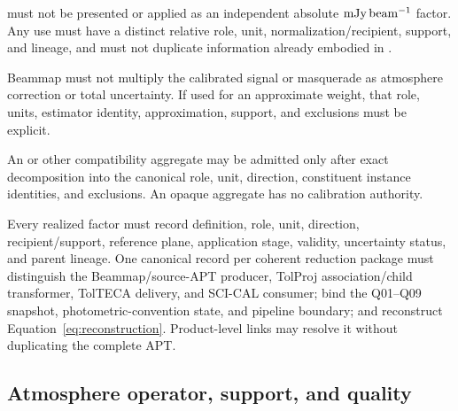 \begin{description}[style=nextline]
\item[\Req{017}: responsivity boundary.]
   must not be presented or applied as an independent
  absolute \(\mathrm{mJy\,beam^{-1}}\) factor. Any use must have a distinct relative role,
  unit, normalization/recipient, support, and lineage, and must not duplicate
  information already embodied in .

\item[\Req{018}: sensitivity boundary.]
  Beammap  must not multiply the calibrated signal or masquerade as
  atmosphere correction or total uncertainty. If used for an approximate
  weight, that role, units, estimator identity, approximation, support, and
  exclusions must be explicit.

\item[\Req{019}: compatibility factor boundary.]
  An  or other compatibility aggregate may be admitted only after
  exact decomposition into the canonical role, unit, direction, constituent
  instance identities, and exclusions. An opaque aggregate has no calibration
  authority.

\item[\Req{020}: factor and package lineage.]
  Every realized factor must record definition, role, unit, direction,
  recipient/support, reference plane, application stage, validity,
  uncertainty status, and parent lineage. One canonical record per coherent
  reduction package must distinguish the Beammap/source-APT producer, TolProj
  association/child transformer, TolTECA delivery, and SCI-CAL consumer; bind
  the Q01--Q09 snapshot, photometric-convention state, and pipeline boundary;
  and reconstruct Equation~\eqref{eq:reconstruction}. Product-level links may
  resolve it without duplicating the complete APT.
\end{description}

\subsection{Atmosphere operator, support, and quality}

